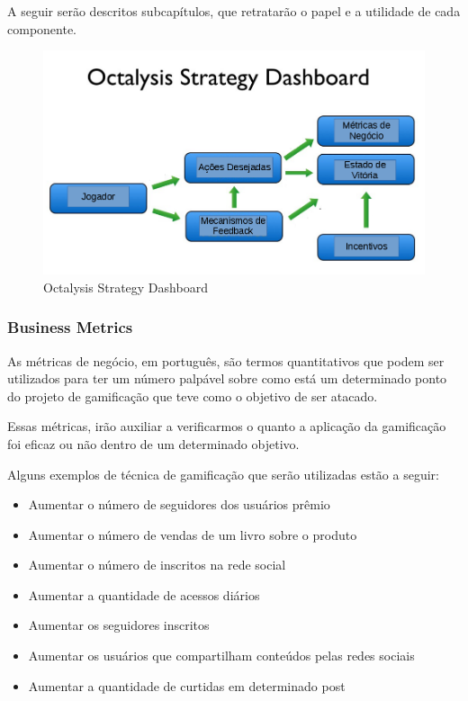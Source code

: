 A seguir serão descritos subcapítulos, que retratarão o papel e a utilidade de
cada
componente.


 \begin{figure}[h]
     \centering

     \includegraphics[width=450px, scale=1]{figuras/dashboard}
     \caption{Octalysis Strategy Dashboard}

     \label{fig:dashboard}
 \end{figure}

\subsubsection{Business Metrics}
\label{sub:business_metrics}
As métricas de negócio, em português, são termos quantitativos que podem ser utilizados
para ter um número palpável sobre como está um determinado ponto do projeto de gamificação
que teve como o objetivo de ser atacado.

Essas métricas, irão auxiliar a verificarmos o quanto a aplicação da gamificação
 foi eficaz ou
não dentro de um determinado objetivo.

Alguns exemplos de técnica de gamificação que serão utilizadas estão a seguir:

\begin{itemize}
    \item Aumentar o número de seguidores dos usuários prêmio
    \item Aumentar o número de vendas de um livro sobre o produto
    \item Aumentar o número de inscritos na rede social
    \item Aumentar a quantidade de acessos diários
    \item Aumentar os seguidores inscritos
    \item Aumentar os usuários que compartilham conteúdos pelas redes sociais
    \item Aumentar a quantidade de curtidas em determinado post
\end{itemize}

